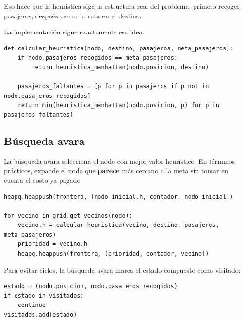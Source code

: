 \documentclass[12pt,a4paper]{article}
\begin{document}
Eso hace que la heurística siga la estructura real del problema: primero recoger pasajeros, después cerrar la ruta en el destino.

La implementación sigue exactamente esa idea:

\begin{lstlisting}[style=pythonstyle,caption={Heurística implementada}]
def calcular_heuristica(nodo, destino, pasajeros, meta_pasajeros):
    if nodo.pasajeros_recogidos == meta_pasajeros:
        return heuristica_manhattan(nodo.posicion, destino)

    pasajeros_faltantes = [p for p in pasajeros if p not in nodo.pasajeros_recogidos]
    return min(heuristica_manhattan(nodo.posicion, p) for p in pasajeros_faltantes)
\end{lstlisting}

\subsection{Búsqueda avara}
La búsqueda avara selecciona el nodo con mejor valor heurístico. En términos prácticos, expande el nodo que \textbf{parece} más cercano a la meta sin tomar en cuenta el costo ya pagado.

\begin{lstlisting}[style=pythonstyle,caption={Implementación de búsqueda avara (prioridad por h)}]
heapq.heappush(frontera, (nodo_inicial.h, contador, nodo_inicial))

for vecino in grid.get_vecinos(nodo):
    vecino.h = calcular_heuristica(vecino, destino, pasajeros, meta_pasajeros)
    prioridad = vecino.h
    heapq.heappush(frontera, (prioridad, contador, vecino))
\end{lstlisting}

Para evitar ciclos, la búsqueda avara marca el estado compuesto como visitado:

\begin{lstlisting}[style=pythonstyle,caption={Control de ciclos en búsqueda avara}]
estado = (nodo.posicion, nodo.pasajeros_recogidos)
if estado in visitados:
    continue
visitados.add(estado)
\end{lstlisting}
\end{document}
